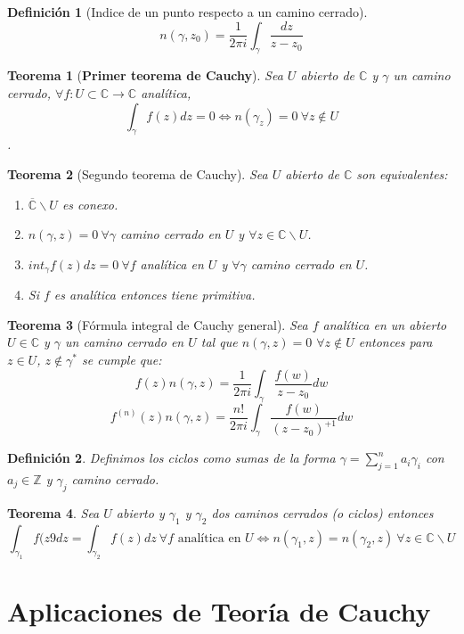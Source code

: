 \documentclass[12pt]{book}
\newtheorem{defi}{Definición}[chapter]
\newtheorem{theorem}{Teorema}[chapter]
\newcommand{\C}{\mathbb{C}}
\newcommand{\Z}{\mathbb{Z}}
\newcommand{\f}{f: U\subset \C \longrightarrow \C}
\begin{document}
\begin{defi}[Indice de un punto respecto a un camino cerrado]
$$n(\gamma,z_0) = \frac{1}{2\pi i}\int_\gamma \frac{dz}{z-z_0}$$
\end{defi}


\begin{theorem}[\textbf{Primer teorema de Cauchy}]
Sea $U$ abierto de $\C$ y $\gamma$ un camino cerrado, $\forall \f$ analítica, $$\int_\gamma f(z)dz = 0 \Leftrightarrow n(\gamma_z)=0 \ \forall z \notin U$$.
\end{theorem} 
\begin{theorem}[Segundo teorema de Cauchy]
Sea $U$ abierto de $\C$ son equivalentes:
\begin{enumerate}
\item $\overline{\C}\backslash U$ es conexo.
\item $n(\gamma,z)=0 \ \forall \gamma$ camino cerrado en $U$ y $\forall z \in \C\backslash U$.
\item $int_\gamma f(z)dz = 0 \ \forall f$ analítica en $U$ y $\forall \gamma$ camino cerrado en $U$.
\item Si $f$ es analítica entonces tiene primitiva.
\end{enumerate}
\end{theorem}


\begin{theorem}[Fórmula integral de Cauchy general]
Sea $f$ analítica en un abierto $U\in\C$ y $\gamma$ un camino cerrado en $U$ tal que $n(\gamma,z)=0$ $\forall z \notin U$ entonces para $z \in U$, $z \notin\gamma^*$ se cumple que:
$$f(z)n(\gamma,z) = \frac{1}{2\pi i}\int_\gamma \frac{f(w)}{z-z_0}dw$$
$$f^{(n)}(z)n(\gamma,z) = \frac{n!}{2\pi i}\int_\gamma \frac{f(w)}{(z-z_0)^{+1}}dw$$
\end{theorem}

\begin{defi}
Definimos los ciclos como sumas de la forma $\gamma = \sum_{j=1}^n a_i\gamma_i$ con $a_j \in\Z$ y $\gamma_j$ camino cerrado.
\end{defi}

\begin{theorem}
Sea $U$ abierto y $\gamma_1$ y $\gamma_2$ dos caminos cerrados (o ciclos) entonces
$$\int_{\gamma_1} f(z9dz = \int_{\gamma_2} f(z)dz\ \forall f \text{ analítica en }U \Leftrightarrow n(\gamma_1,z) = n(\gamma_2,z) \ \forall z\in \C\backslash U$$
\end{theorem}

\section{Aplicaciones de Teoría de Cauchy}
\end{document}
